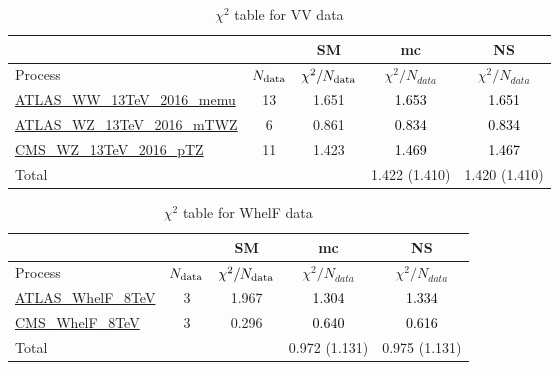 \documentclass{article}
\begin{document}
\begin{table}[H]
\centering
\begin{tabular}{|l|c|c|c|c|}
\hline
 \multicolumn{2}{|c|}{} & SM& mc& NS\\ \hline
Process & $N_{\rm data}$ & $\chi^ 2/N_{\rm data}$& $\chi^ 2/N_{data}$& $\chi^ 2/N_{data}$\\ \hline
\href{https://arxiv.org/abs/1905.04242}{ATLAS_WW_13TeV_2016_memu} & 13 & 1.651 & \textcolor{black}{1.653} & \textcolor{black}{1.651} \\ \hline
\href{https://arxiv.org/abs/1902.05759}{ATLAS_WZ_13TeV_2016_mTWZ} & 6 & 0.861 & \textcolor{black}{0.834} & \textcolor{black}{0.834} \\ \hline
\href{https://arxiv.org/abs/1901.03428}{CMS_WZ_13TeV_2016_pTZ} & 11 & 1.423 & \textcolor{black}{1.469} & \textcolor{black}{1.467} \\ \hline
\hline Total & &  & 1.422 (1.410) & 1.420 (1.410) \\ \hline
\end{tabular}
\caption{$\chi^2$ table for VV data}
\end{table}
\begin{table}[H]
\centering
\begin{tabular}{|l|c|c|c|c|}
\hline
 \multicolumn{2}{|c|}{} & SM& mc& NS\\ \hline
Process & $N_{\rm data}$ & $\chi^ 2/N_{\rm data}$& $\chi^ 2/N_{data}$& $\chi^ 2/N_{data}$\\ \hline
\href{https://arxiv.org/abs/1612.02577}{ATLAS_WhelF_8TeV} & 3 & 1.967 & \textcolor{black}{1.304} & \textcolor{black}{1.334} \\ \hline
\href{https://arxiv.org/abs/1605.09047}{CMS_WhelF_8TeV} & 3 & 0.296 & \textcolor{black}{0.640} & \textcolor{black}{0.616} \\ \hline
\hline Total & &  & 0.972 (1.131) & 0.975 (1.131) \\ \hline
\end{tabular}
\caption{$\chi^2$ table for WhelF data}
\end{table}
\end{document}
